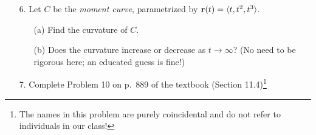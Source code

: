 \documentclass[reqno, 12pt]{amsart}
\begin{document}
\begin{itemize}
    \newpage
  \item[6.] Let $C$ be the \emph{moment curve}, parametrized by ${\bf r}(t) = \langle t, t^2, t^3 \rangle$.

    \smallskip
    \begin{itemize}
      \item[(a)] Find the curvature of $C$.

        \vspace{4 in}
      \item[(b)] Does the curvature increase or decrease as $t \rightarrow \infty$? (No need to be rigorous here; an educated guess is fine!)
    \end{itemize}

    \newpage
  \item[7.] Complete Problem 10 on p.~889 of the textbook (Section 11.4)\footnote{The names in this problem are purely coincidental and do not refer to individuals in our class!}

\end{itemize}
\end{document}
